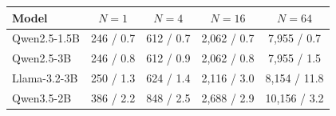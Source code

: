 \begin{tabular}{lcccc}
\toprule
Model & $N{=}1$ & $N{=}4$ & $N{=}16$ & $N{=}64$ \\
\midrule
Qwen2.5-1.5B & 246 / 0.7 & 612 / 0.7 & 2,062 / 0.7 & 7,955 / 0.7 \\
Qwen2.5-3B & 246 / 0.8 & 612 / 0.9 & 2,062 / 0.8 & 7,955 / 1.5 \\
Llama-3.2-3B & 250 / 1.3 & 624 / 1.4 & 2,116 / 3.0 & 8,154 / 11.8 \\
Qwen3.5-2B & 386 / 2.2 & 848 / 2.5 & 2,688 / 2.9 & 10,156 / 3.2 \\
\bottomrule
\end{tabular}